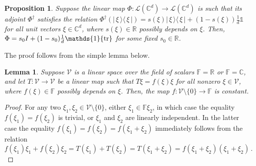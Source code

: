 \documentclass[12pt,reqno]{amsart}
\newtheorem{proposition}{Proposition}
\newtheorem{lemma}{Lemma}
\theoremstyle{definition}
\newcommand{\kb}[2]{\vert\,#1\,\rangle\langle\,#2\,\vert} %
\newcommand{\id}{\mathds{1}} %
\newcommand{\Cb}{\mathbb{C}} %
\newcommand{\Fb}{\mathbb{F}} %
\newcommand{\Rb}{\mathbb{R}} %
\newcommand{\ca}[1]{\mathcal{#1}} %
\newcommand{\lc}[1]{\mathcal{L}(\Cb^{#1})} %
\begin{document}
\begin{proposition}\label{prop:lin}
Suppose the linear map $\Phi:\lc{d}\to\lc{d}$ is such that its adjoint $\Phi^\dag$ satisfies the relation $\Phi^\dag(\kb{\xi}{\xi}) = s(\xi) \kb{\xi}{\xi} + (1-s(\xi))\tfrac{1}{d}\id$ for all unit vectors $\xi\in\Cb^d$, where $s(\xi)\in\Rb$ possibly depends on $\xi$. Then, $\Phi = s_0 I + (1-s_0)\tfrac{1}{d}\id {\rm tr}$ for some fixed $s_0\in\Rb$.
\end{proposition}
The proof follows from the simple lemma below.
\begin{lemma}\label{lem:lin}
Suppose $\ca{V}$ is a linear space over the field of scalars $\Fb=\Rb$ or $\Fb=\Cb$, and let $T:\ca{V}\to\ca{V}$ be a linear map such that $T\xi = f(\xi)\xi$ for all nonzero $\xi\in\ca{V}$, where $f(\xi)\in\Fb$ possibly depends on $\xi$. Then, the map $f:\ca{V}\setminus\{0\}\to\Fb$ is constant.
\end{lemma}
\begin{proof}
For any two $\xi_1,\xi_2\in\ca{V}\setminus\{0\}$, either $\xi_1\in\Fb\xi_2$, in which case the equality $f(\xi_1) = f(\xi_2)$ is trivial, or $\xi_1$ and $\xi_2$ are linearly independent. In the latter case the equality $f(\xi_1) = f(\xi_2) = f(\xi_1+\xi_2)$ immediately follows from the relation
$$
f(\xi_1) \xi_1 + f(\xi_2) \xi_2 = T(\xi_1) + T(\xi_2) = T(\xi_1+\xi_2) = f(\xi_1+\xi_2) (\xi_1 + \xi_2)\,.
$$
\end{proof}
\end{document}
